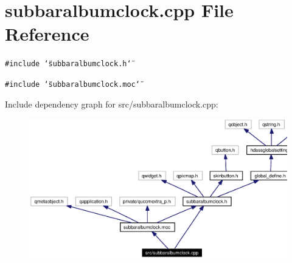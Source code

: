 \section{subbaralbumclock.cpp File Reference}
\label{src_2subbaralbumclock_8cpp}


{\tt \#include \char`\"{}subbaralbumclock.h\char`\"{}}\par
{\tt \#include \char`\"{}subbaralbumclock.moc\char`\"{}}\par


Include dependency graph for src/subbaralbumclock.cpp:\begin{figure}[H]
\begin{center}
\leavevmode
\includegraphics[width=328pt]{src_2subbaralbumclock_8cpp__incl}
\end{center}
\end{figure}
